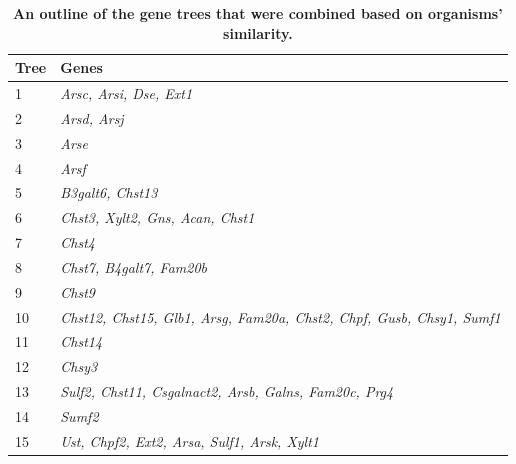\documentclass{article}
\begin{document}
\begin{table}[]
\begin{tabular}{ll}
\hline
\textbf{Tree} & \textbf{Genes}													\\ 
\hline
1             & \textit{Arsc, Arsi, Dse, Ext1}                                               						\\
2             & \textit{Arsd, Arsj}                                                          						\\
3             & \textit{Arse}                                                                							\\
4             & \textit{Arsf}                                                                							\\
5             & \textit{B3galt6, Chst13}                                                     						\\
6             & \textit{Chst3, Xylt2, Gns, Acan, Chst1}                                      					\\
7             & \textit{Chst4}                                                               						\\
8             & \textit{Chst7, B4galt7, Fam20b}                                              					\\
9             & \textit{Chst9}                                                               						\\
10            & \textit{Chst12, Chst15, Glb1, Arsg, Fam20a, Chst2, Chpf, Gusb, Chsy1, Sumf1} 	\\
11            & \textit{Chst14}                                                              						\\
12            & \textit{Chsy3}                                                               						\\
13            & \textit{Sulf2, Chst11, Csgalnact2, Arsb, Galns, Fam20c, Prg4}                			\\
14            & \textit{Sumf2}                                                               						\\
15            & \textit{Ust, Chpf2, Ext2, Arsa, Sulf1, Arsk, Xylt1}                          				\\ 
\hline
\end{tabular}
\caption{\textbf{An outline of the gene trees that were combined based on organisms' similarity.}}
\label{tab_1}
\end{table}
\end{document}

